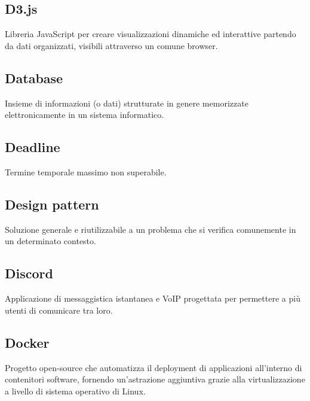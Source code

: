 \documentclass[../glossario.tex]{subfiles}
\begin{document}
    
\subsection*{D3.js}
Libreria JavaScript per creare visualizzazioni dinamiche ed interattive partendo da dati organizzati, visibili attraverso un comune browser.

\subsection*{Database}
Insieme di informazioni (o dati) strutturate in genere memorizzate elettronicamente in un sistema informatico.

\subsection*{Deadline}
Termine temporale massimo non superabile.

\subsection*{Design pattern}
Soluzione generale e riutilizzabile a un problema che si verifica comunemente in un determinato contesto.

\subsection*{Discord}
Applicazione di messaggistica istantanea e VoIP progettata per permettere a più utenti di comunicare tra loro.

\subsection*{Docker}
Progetto open-source che automatizza il deployment di applicazioni all'interno di contenitori software, fornendo un'astrazione aggiuntiva grazie alla virtualizzazione a livello di sistema operativo di Linux.
\end{document}
